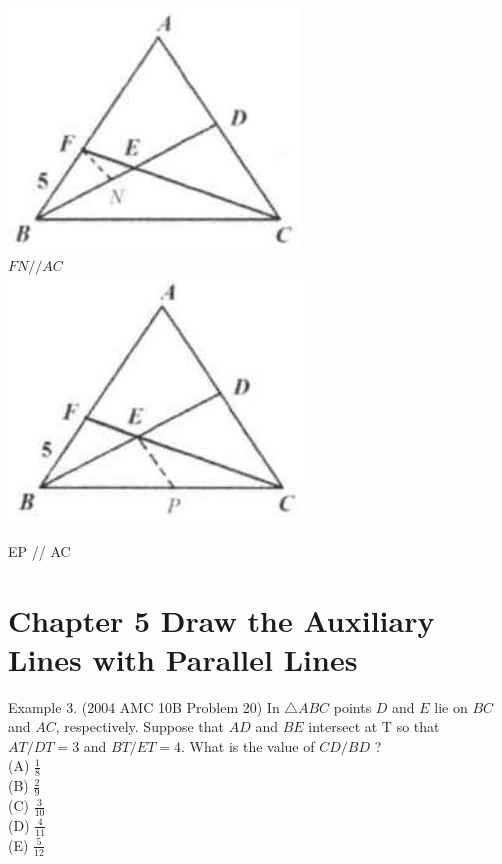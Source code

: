 \documentclass[10pt]{article}
\begin{document}
\includegraphics[max width=\textwidth, center]{2025_04_17_97bc1f7e44d93c271a88g-103(4)}\\
\(F N / / A C\)\\
\includegraphics[max width=\textwidth, center]{2025_04_17_97bc1f7e44d93c271a88g-103(3)}

EP // AC

\section*{Chapter 5 Draw the Auxiliary Lines with Parallel Lines}
Example 3. (2004 AMC 10B Problem 20) In \(\triangle A B C\) points \(D\) and \(E\) lie on \(B C\) and \(A C\), respectively. Suppose that \(A D\) and \(B E\) intersect at T so that \(A T / D T=3\) and \(B T / E T=4\). What is the value of \(C D / B D\) ?\\
(A) \(\frac{1}{8}\)\\
(B) \(\frac{2}{9}\)\\
(C) \(\frac{3}{10}\)\\
(D) \(\frac{4}{11}\)\\
(E) \(\frac{5}{12}\)
\end{document}
